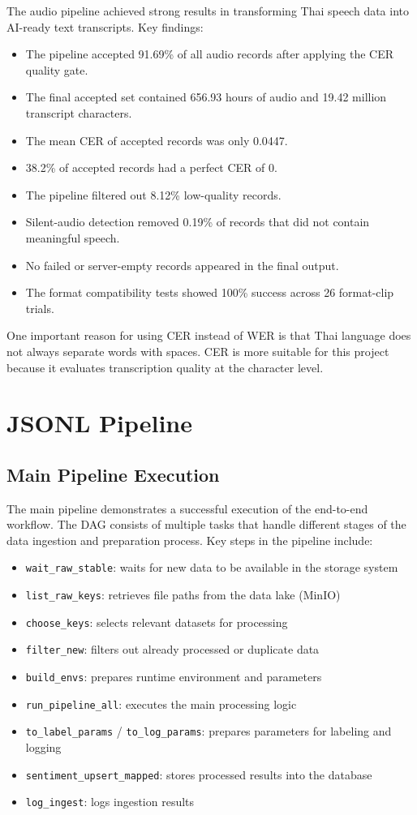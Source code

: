 \documentclass[12pt,oneside,openright,a4paper]{cpe-english-project}
\begin{document}
The audio pipeline achieved strong results in transforming Thai speech data into AI-ready text transcripts. Key findings:
\begin{itemize}
\item The pipeline accepted 91.69\% of all audio records after applying the CER quality gate.
\item The final accepted set contained 656.93 hours of audio and 19.42 million transcript characters.
\item The mean CER of accepted records was only 0.0447.
\item 38.2\% of accepted records had a perfect CER of 0.
\item The pipeline filtered out 8.12\% low-quality records.
\item Silent-audio detection removed 0.19\% of records that did not contain meaningful speech.
\item No failed or server-empty records appeared in the final output.
\item The format compatibility tests showed 100\% success across 26 format-clip trials.
\end{itemize}

One important reason for using CER instead of WER is that Thai language does not always separate words with spaces. CER is more suitable for this project because it evaluates transcription quality at the character level.
\newpage
\section{JSONL Pipeline}

\subsection{Main Pipeline Execution}

The main pipeline demonstrates a successful execution of the end-to-end workflow. The DAG consists of multiple tasks that handle different stages of the data ingestion and preparation process. Key steps in the pipeline include:
\begin{itemize}
\item \texttt{wait\_raw\_stable}: waits for new data to be available in the storage system
\item \texttt{list\_raw\_keys}: retrieves file paths from the data lake (MinIO)
\item \texttt{choose\_keys}: selects relevant datasets for processing
\item \texttt{filter\_new}: filters out already processed or duplicate data
\item \texttt{build\_envs}: prepares runtime environment and parameters
\item \texttt{run\_pipeline\_all}: executes the main processing logic
\item \texttt{to\_label\_params} / \texttt{to\_log\_params}: prepares parameters for labeling and logging
\item \texttt{sentiment\_upsert\_mapped}: stores processed results into the database
\item \texttt{log\_ingest}: logs ingestion results
\end{itemize}
\end{document}
